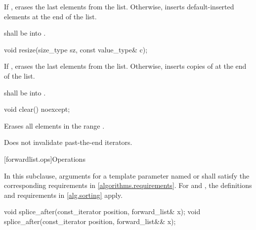 \begin{itemdescr}
\pnum
\effects If , erases the last  elements from the list. Otherwise, inserts  default-inserted
elements at the end of the list.

\pnum
\requires {} shall be  into .
\end{itemdescr}

\begin{itemdecl}
void resize(size_type sz, const value_type& c);
\end{itemdecl}

\begin{itemdescr}
\pnum
\effects If , erases the last  elements from the list. Otherwise, inserts 
copies of  at the end of the list.

\pnum
\requires {} shall be  into .
\end{itemdescr}


%
\begin{itemdecl}
void clear() noexcept;
\end{itemdecl}

\begin{itemdescr}
\pnum
\effects Erases all elements in the range .

\pnum
\remarks Does not invalidate past-the-end iterators.
\end{itemdescr}

[forwardlist.ops]{Operations}

\pnum
In this subclause,
arguments for a template parameter
named  or 
shall satisfy the corresponding requirements in \ref{algorithms.requirements}.
For  and ,
the definitions and requirements in \ref{alg.sorting} apply.

%
\begin{itemdecl}
void splice_after(const_iterator position, forward_list& x);
void splice_after(const_iterator position, forward_list&& x);
\end{itemdecl}

